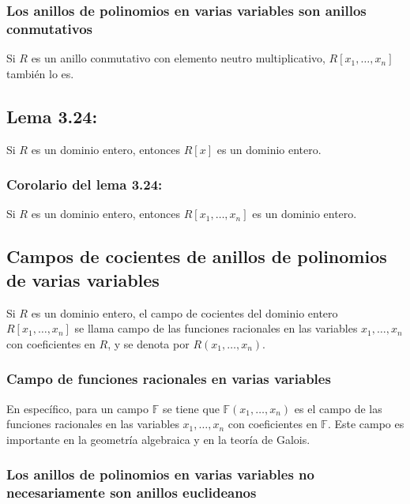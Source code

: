 \documentclass{article}
\begin{document}
\subsubsection*{\color{purple} Los anillos de polinomios en varias variables son anillos conmutativos}

Si $R$ es un anillo conmutativo con elemento neutro multiplicativo, $R[x_1,\ldots,x_n]$ también lo es.

\subsection*{\color{blue} Lema 3.24:}

Si $R$ es un dominio entero, entonces $R[x]$ es un dominio entero.

\subsubsection*{\color{blue} Corolario del lema 3.24:}

Si $R$ es un dominio entero, entonces $R[x_1,\ldots,x_n]$ es un dominio entero.

\subsection*{\color{violet} Campos de cocientes de anillos de polinomios de varias variables}

Si $R$ es un dominio entero, el campo de cocientes del dominio entero $R[x_1,\ldots,x_n]$ se llama campo de las funciones racionales en las variables $x_1,\ldots,x_n$ con coeficientes en $R$, y se denota por $R(x_1,\ldots,x_n)$. 

\subsubsection*{\color{teal} Campo de funciones racionales en varias variables}

En específico, para un campo $\mathbb{F}$ se tiene que $\mathbb{F}(x_1,\ldots,x_n)$ es el campo de las funciones racionales en las variables $x_1,\ldots,x_n$ con coeficientes en $\mathbb{F}$. Este campo es importante en la geometría algebraica y en la teoría de Galois.

\subsubsection*{\color{purple} Los anillos de polinomios en varias variables no necesariamente son anillos euclideanos}
\end{document}
